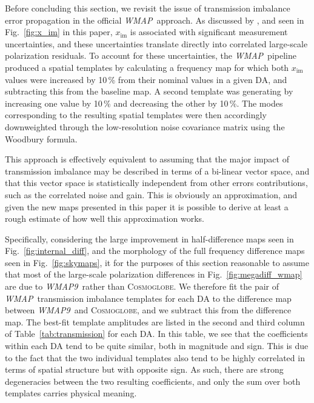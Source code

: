\documentclass[twocolumn]{../../common/aa}
\def\WMAP{\emph{WMAP}}
\def\WMAPnine{\emph{WMAP9}}
\newcommand{\cosmoglobe}{\textsc{Cosmoglobe}}
\begin{document}
Before concluding this section, we revisit the issue of transmission imbalance error propagation in the official \WMAP\ approach. As discussed by \citet{jarosik2007}, and seen in Fig.~\ref{fig:x_im} in this paper, $x_{\mathrm{im}}$ is associated with significant measurement uncertainties, and these uncertainties translate directly into correlated large-scale polarization residuals. To account for these uncertainties, the \WMAP\ pipeline produced a spatial templates by calculating a frequency map for which both $x_{\textrm{im}}$ values were increased by 10\,\% from their nominal values in a given DA, and subtracting this from the baseline map. A second template was generating by increasing one value by 10\,\% and decreasing the other by 10\,\%. The modes corresponding to the resulting spatial templates were then accordingly downweighted through the low-resolution noise covariance matrix using the Woodbury formula.

This approach is effectively equivalent to assuming that the major impact of transmission imbalance may be described in terms of a bi-linear vector space, and that this vector space is statistically independent from other errors contributions, such as the correlated noise and gain. This is obviously an approximation, and given the new maps presented in this paper it is possible to derive at least a rough estimate of how well this approximation works.

Specifically, considering the large improvement in half-difference maps seen in Fig.~\ref{fig:internal_diff}, and the morphology of the full frequency difference maps seen in Fig.~\ref{fig:skymaps}, it for the purposes of this section reasonable to assume that most of the large-scale polarization differences in Fig.~\ref{fig:megadiff_wmap} are due to \WMAPnine\ rather than \cosmoglobe. We therefore fit the pair of \WMAP\ transmission imbalance templates for each DA to the difference map between \WMAPnine\ and \cosmoglobe, and we subtract this from the difference map. The best-fit template amplitudes are listed in the second and third column of Table~\ref{tab:transmission} for each DA. In this table, we see that the coefficients within each DA tend to be quite similar, both in magnitude and sign. This is due to the fact that the two individual templates also tend to be highly correlated in terms of spatial structure but with opposite sign. As such, there are strong degeneracies between the two resulting coefficients, and only the sum over both templates carries physical meaning. 
\end{document}
